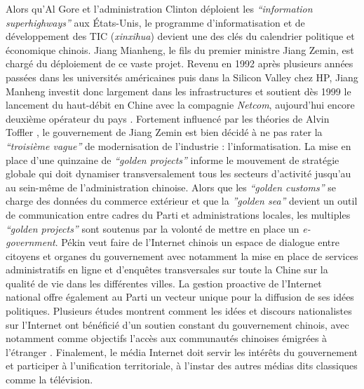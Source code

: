 Alors qu’Al Gore et l’administration Clinton déploient les \textit{“information superhighways”} aux États-Unis, le programme d’informatisation et de développement des TIC (\textit{xinxihua}) devient une des clés du calendrier politique et économique chinois. Jiang Mianheng, le fils du premier ministre Jiang Zemin, est chargé du déploiement de ce vaste projet. Revenu en 1992 après plusieurs années passées dans les universités américaines puis dans la Silicon Valley chez HP, Jiang Manheng investit donc largement dans les infrastructures et soutient dès 1999 le lancement du haut-débit en Chine avec la compagnie \textit{Netcom}, aujourd’hui encore deuxième opérateur du pays \citep{Dai2007}. Fortement influencé par les théories de Alvin Toffler \citep{Tsui2007}, le gouvernement de Jiang Zemin est bien décidé à ne pas rater la \textit{“troisième vague”} de modernisation de l’industrie : l’informatisation. La mise en place d’une quinzaine de \textit{“golden projects”} informe le mouvement de stratégie globale qui doit dynamiser transversalement tous les secteurs d’activité jusqu’au au sein-même de l’administration chinoise. Alors que les \textit{“golden customs”} se charge des données du commerce extérieur et que la \textit{”golden sea”} devient un outil de communication entre cadres du Parti et administrations locales, les multiples \textit{“golden projects”} sont soutenus par la volonté de mettre en place un \textit{e-government}. Pékin veut faire de l’Internet chinois un espace de dialogue entre citoyens et organes du gouvernement avec notamment la mise en place de services administratifs en ligne et d’enquêtes transversales sur toute la Chine sur la qualité de vie dans les différentes villes. La gestion proactive de l’Internet national offre également au Parti un vecteur unique pour la diffusion de ses idées politiques. Plusieurs études montrent comment les idées et discours nationalistes sur l’Internet ont bénéficié d’un soutien constant du gouvernement chinois, avec notamment comme objectifs l’accès aux communautés chinoises émigrées à l’étranger \citep{Hugues2000}. Finalement, le média Internet doit servir les intérêts du gouvernement et participer à l’unification territoriale, à l’instar des autres médias dits classiques comme la télévision.

